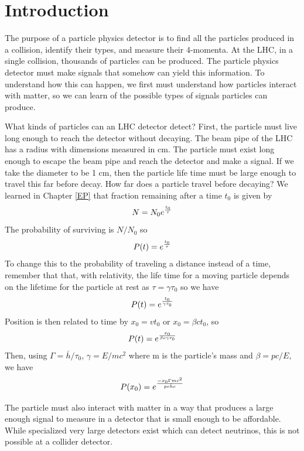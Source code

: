 
\section{Introduction}

The purpose of a particle physics detector is to find all the particles produced
in a collision, identify their types, and measure their 4-momenta.
At the LHC, in a single collision, thousands of particles can be produced.
The particle physics detector must make signals that somehow can yield this information.
To understand how this can happen, we first must understand how particles interact
with matter, so we can learn of the possible types of signals particles can produce.

What kinds of particles can an LHC detector detect?  First, the particle must live long 
enough to reach the detector without decaying.  The beam pipe of the LHC has a 
radius with dimensions measured in cm.  The particle must exist long enough to escape the beam pipe and
reach the detector and make a signal.  If we take the diameter to be 1 cm, then
the particle life time must be large enough to travel this far before decay.
How far does a particle travel before decaying?  We learned in Chapter \ref{EP} that fraction remaining after a time $t_0$ is given by
\begin{equation}
N=N_0 e^{t_0 \over \tau}
\end{equation}
The probability of surviving is $N / N_0$ so
\begin{equation}
P(t)= e^{t_0 \over \tau}
\end{equation}
To change this to the probability of traveling a distance instead of a time, remember that that, with relativity, the life time for a moving particle depends on the lifetime for the particle at rest as $\tau = \gamma \tau_0$ so we have
 \begin{equation}
P(t)=e^{t_0 \over {\gamma \tau_0}}
\end{equation}
Position is then related to time by $x_0=vt_0$ or $x_0=\beta c t_0$, so
\begin{equation}
P(t)=e^{x_0 \over {\beta c \gamma \tau_0}}
\end{equation}
Then, using
$\Gamma=\bar{h}/\tau_0$, $\gamma=E/mc^2$ where m is the particle's mass 
and $\beta=pc/E$, we have
\begin{equation}
P(x_0)=e^{{-x_0\Gamma mc^2}\over{pc\bar{h}c}}
\end{equation}

The particle must also interact  with matter in a way that produces a large enough signal to measure in a detector that is small enough to be affordable.  While specialized very large detectors exist which can detect neutrinos, this is not possible at a collider detector.

